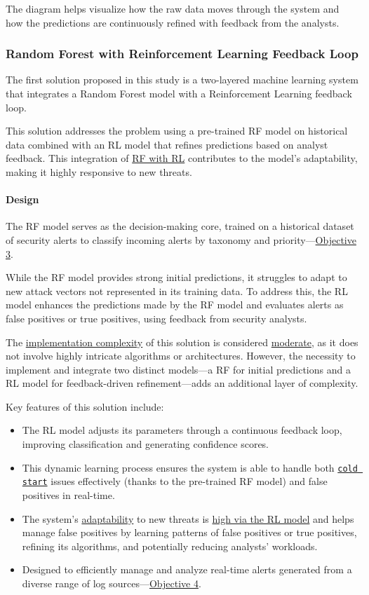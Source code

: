 The diagram helps visualize how the raw data moves through the system and how the predictions are continuously refined with feedback from the analysts.

\subsubsection{Random Forest with Reinforcement Learning Feedback Loop}

The first solution proposed in this study is a two-layered machine learning system that integrates a Random Forest model with a Reinforcement Learning feedback loop. 

This solution addresses the problem using a pre-trained RF model on historical data combined with an RL model that refines predictions based on analyst feedback.
This integration of \underline{RF with RL} contributes to the model's adaptability, making it highly responsive to new threats.

\paragraph{Design} 

The RF model serves as the decision-making core, trained on a historical dataset of security alerts to classify incoming alerts by taxonomy and priority—\hyperref[objective3]{Objective 3}.

While the RF model provides strong initial predictions, it struggles to adapt to new attack vectors not represented in its training data. 
To address this, the RL model enhances the predictions made by the RF model and evaluates alerts as false positives or true positives, using feedback from security analysts.

The \underline{implementation complexity} of this solution is considered \underline{moderate}, as it does not involve highly intricate algorithms or architectures. 
However, the necessity to implement and integrate two distinct models—a RF for initial predictions and a RL model for feedback-driven refinement—adds an additional layer of complexity. 

Key features of this solution include:
\begin{itemize}
    \item The RL model adjusts its parameters through a continuous feedback loop, improving classification and generating confidence scores.
    \item This dynamic learning process ensures the system is able to handle both \underline{\texttt{cold start}} issues effectively (thanks to the pre-trained RF model) and false positives in real-time.
    \item The system's \underline{adaptability} to new threats is \underline{high via the RL model} and helps manage false positives by learning patterns of false positives or true positives, refining its algorithms, and potentially reducing analysts' workloads.
    \item Designed to efficiently manage and analyze real-time alerts generated from a diverse range of log sources—\hyperref[objective4]{Objective 4}.
\end{itemize}


